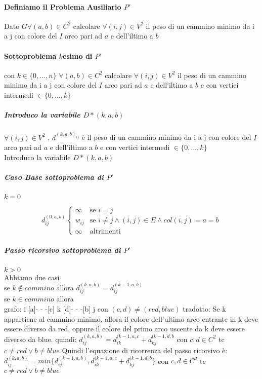 \documentclass[12pt, a4paper, openany]{book}
\begin{document}
\paragraph{Definiamo il Problema Ausiliario $P'$}
Dato $G \forall(a,b) \in C^2$ calcolare $\forall(i,j) \in V^2$ il peso di un cammino minimo da i a j con
colore del $I$ arco pari ad $a$ e dell'iltimo a $b$

\paragraph{Sottoproblema $k$esimo di $P'$} con $k \in \{0,...,n\}$
$\forall(a,b) \in C^2$ calcolare $\forall(i,j) \in V^2$ il peso di un cammino minimo da i a j con
colore del $I$ arco pari ad $a$ e dell'iltimo a $b$ e con vertici intermedi $\in \{0,...,k\}$\\
\subparagraph{Introduco la variabile $D*{(k,a,b)}$}
$\forall(i,j)\in V^2$ , $d^{(k,a,b)_{ij}}$ è il peso di un cammino minimo da i a j  con
colore del $I$ arco pari ad $a$ e dell'iltimo a $b$ e con vertici intermedi $\in \{0,...,k\}$\\
Introduco la variabile $D*{(k,a,b)}$
\subparagraph{Caso Base sottoproblema di $P'$} $k = 0$

\begin{equation*}
	d^{(0,a,b)}_{ij} \begin{cases}
		\infty & \text{se $i=j$}                                             \\
		w_{ij} & \text{se $i\neq j \land (i,j)\in E \land col(i,j) = a = b$} \\
		\infty & \text{altrimenti}
	\end{cases}
\end{equation*}

\subparagraph{Passo ricorsivo sottoproblema di $P'$} $k > 0$\\
Abbiamo due casi\\
se $k \notin cammino$ allora $d^{(k,a,b)}_{ij} = d^{(k-1,a,b)}_{ij}$\\
se $k \in cammino$ allora \\
grafo: i [a]- - -[c] k [d]- - -[b] j con $(c,d) \neq (red,blue)$
tradotto: Se k appartiene al cammino minimo, allora il colore dell'ultimo arco entrante in k deve essere diverso da red, oppure il colore del primo arco uscente da k deve essere diverso da blue.
quindi: $d^{(k,a,b)}_{ij} = d^{(k-1,a,c}_{ik} + d^{(k-1,d,b}_{kj}$ con $c,d \in C^2$ tc $c\neq red \vee b\neq blue$
Quindi l'equazione di ricorrenza del passo ricorsivo è:\\
$d^{(k,a,b)}_{ij} = min\{d^{(k-1,a,b)}_{ij} ,d^{(k-1,a,c}_{ik} + d^{(k-1,d,b}_{kj}\}$ con $c,d \in C^2$ tc $c\neq red \vee b\neq blue$
\end{document}
